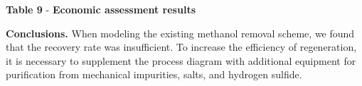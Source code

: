 {\bfseries Table 9} - {\bfseries Economic assessment results}


{\bfseries Conclusions.} When modeling the existing methanol removal
scheme, we found that the recovery rate was insufficient. To increase
the efficiency of regeneration, it is necessary to supplement the
process diagram with additional equipment for purification from
mechanical impurities, salts, and hydrogen sulfide.

